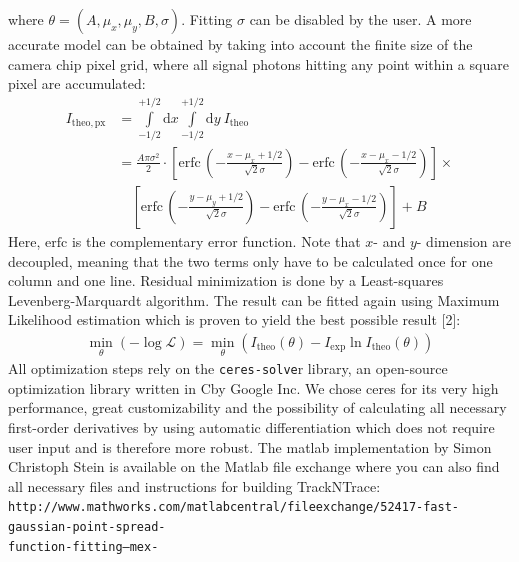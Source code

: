 \documentclass[11pt,onside]{report}
\newcommand{\D}[0]{\text{d}}
\numberwithin{equation}{chapter}
\def\CC{{C\nolinebreak[4]\hspace{-.05em}\raisebox{.4ex}{\tiny\bf ++}}}
\begin{document}
where $\theta = (A,\mu_x,\mu_y,B,\sigma)$. Fitting $\sigma$ can be disabled by the user. A more accurate model can be obtained by taking into account the finite size of the camera chip pixel grid, where all signal photons hitting any point within a square pixel are accumulated:
\begin{align*}
I_\mathrm{theo, px} &= \int\limits^{+1\slash 2}_{-1\slash 2} \D x \int\limits^{+1\slash 2}_{-1\slash 2} \D y\: I_\mathrm{theo} \\
&= \frac{A \pi \sigma^2}{2}\cdot \left[\mathrm{erfc}\,\left(-\frac{x-\mu_x+1\slash 2}{\sqrt{2} \sigma}\right) - \mathrm{erfc}\,\left(-\frac{x-\mu_x-1\slash 2}{\sqrt{2} \sigma}\right)\right] \times \\
&\quad \left[\mathrm{erfc}\,\left(-\frac{y-\mu_y+1\slash 2}{\sqrt{2} \sigma}\right) - \mathrm{erfc}\,\left(-\frac{y-\mu_x-1\slash 2}{\sqrt{2} \sigma}\right)\right] +B
\end{align*}
Here, $\mathrm{erfc}$ is the complementary error function. Note that $x$- and $y$- dimension are decoupled, meaning that the two terms only have to be calculated once for one column and one line. Residual minimization is done by a Least-squares Levenberg-Marquardt algorithm. The result can be fitted again using Maximum Likelihood estimation which is proven to yield the best possible result [2]:
\begin{align*}
\min_\theta (-\log\mathcal{L}) = \min_\theta (I_\mathrm{theo}(\theta) - I_\mathrm{exp} \ln I_\mathrm{theo}(\theta))
\end{align*}
All optimization steps rely on the \texttt{ceres-solve}r library, an open-source optimization library written in \CC by Google Inc. We chose ceres for its very high performance, great customizability and the possibility of calculating all necessary first-order derivatives by using automatic differentiation which does not require user input and is therefore more robust. The matlab implementation by Simon Christoph Stein is available on the Matlab file exchange where you can also find all necessary files and instructions for building {TrackNTrace}:  \texttt{http://www.mathworks.com/matlabcentral/fileexchange/52417-fast-gaussian-point-spread-\\function-fitting--mex-}\\[10pt]
\end{document}
